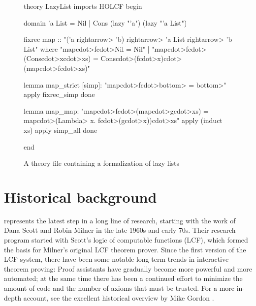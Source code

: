 


\begin{figure}
\begin{isacode}
theory LazyList imports HOLCF begin

  domain 'a List = Nil | Cons (lazy "'a") (lazy "'a List")

  fixrec map :: "('a \<rightarrow> 'b) \<rightarrow> 'a List \<rightarrow> 'b List"
    where "map\<cdot>f\<cdot>Nil = Nil"
    | "map\<cdot>f\<cdot>(Cons\<cdot>x\<cdot>xs) = Cons\<cdot>(f\<cdot>x)\<cdot>(map\<cdot>f\<cdot>xs)"

  lemma map_strict [simp]: "map\<cdot>f\<cdot>\<bottom> = \<bottom>"
    apply fixrec_simp
    done

  lemma map_map: "map\<cdot>f\<cdot>(map\<cdot>g\<cdot>xs) = map\<cdot>(\<Lambda> x. f\<cdot>(g\<cdot>x))\<cdot>xs"
    apply (induct xs)
    apply simp_all
    done

end
\end{isacode}
\caption{A  theory file containing a formalization of lazy lists}
\label{fig:intro-lazy-list-thy}
\end{figure}

\section{Historical background}
\label{sec:intro-history}

 represents the latest step in a long line of research, starting with the work of Dana Scott and Robin Milner in the late 1960s and early 70s. Their research program started with Scott's logic of computable functions (LCF), which formed the basis for Milner's original LCF theorem prover. Since the first version of the LCF system, there have been some notable long-term trends in interactive theorem proving: Proof assistants have gradually become more powerful and more automated; at the same time there has been a continued effort to minimize the amount of code and the number of axioms that must be trusted. For a more in-depth account, see the excellent historical overview by Mike Gordon \cite{Gordon2000}.

